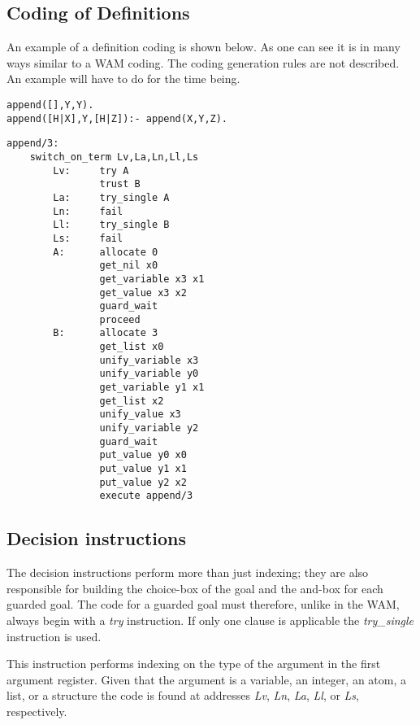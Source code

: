 \subsection*{Coding of Definitions}

An example of a definition coding is shown below.  As one can see it
is in many ways similar to a WAM \cite{wam} coding.  The coding
generation rules are not described.  An example will have to do for
the time being.

\begin{verbatim}
append([],Y,Y).
append([H|X],Y,[H|Z]):- append(X,Y,Z).
\end{verbatim}

\begin{verbatim}
append/3:
    switch_on_term Lv,La,Ln,Ll,Ls
        Lv:     try A
                trust B
        La:     try_single A
        Ln:     fail
        Ll:     try_single B
        Ls:     fail
        A:      allocate 0
                get_nil x0
                get_variable x3 x1
                get_value x3 x2
                guard_wait
                proceed
        B:      allocate 3
                get_list x0
                unify_variable x3
                unify_variable y0
                get_variable y1 x1
                get_list x2
                unify_value x3
                unify_variable y2
                guard_wait
                put_value y0 x0
                put_value y1 x1
                put_value y2 x2
                execute append/3
\end{verbatim}



\subsection*{Decision instructions}

The decision instructions perform more than just indexing; they are
also responsible for building the choice-box of the goal and the
and-box for each guarded goal. The code for a guarded goal must
therefore, unlike in the WAM, always begin with a {\em try}
instruction. If only one clause is applicable the {\em try\_single}
instruction is used.


This instruction performs indexing on the type of the argument in the
first argument register.  Given that the argument is a variable, an
integer, an atom, a list, or a structure the code is
found at addresses {\em Lv}, {\em Ln}, {\em La}, {\em Ll}, or {\em
Ls}, respectively. 

